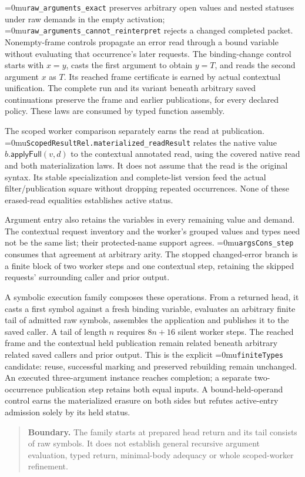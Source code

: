\documentclass[11pt,a4paper]{article}
\newcommand{\code}[1]{\texttt{\detokenize{#1}}}
\newcommand{\name}[1]{\textup{\Urlmuskip=0mu\relax\nolinkurl{#1}}}
\newcommand{\scope}[1]{\par\smallskip\begin{quote}\small\textbf{Boundary.} #1\end{quote}}
\begin{document}
\name{raw_arguments_exact} preserves arbitrary open values and nested
statuses under raw \code{Atom} demands in the empty activation;
\name{raw_arguments_cannot_reinterpret} rejects a changed completed packet.
Nonempty-frame controls propagate an error read through a bound variable
without evaluating that occurrence's later requests. The binding-change
control starts with $x=y$, casts the first argument to obtain $y=T$, and
reads the second argument $x$ as $T$. Its reached frame certificate is earned
by actual contextual unification. The complete run and its variant beneath
arbitrary saved continuations preserve the frame and earlier publications,
for every declared policy. These laws are consumed by typed function assembly.

The scoped worker comparison separately earns the read at publication.
\name{ScopedResultRel.materialized_readResult} relates the native value
$b.\mathsf{applyFull}(v,d)$ to the contextual annotated read, using the
covered native read and both materialization laws. It does not assume that
the read is the original syntax. Its stable specialization and complete-list
version feed the actual filter/publication square without dropping repeated
occurrences. None of these erased-read equalities establishes active status.

Argument entry also retains the variables in every remaining value and
demand. The contextual request inventory and the worker's grouped values and
types need not be the same list; their protected-name support agrees.
\name{argsCons_step} consumes that agreement at arbitrary arity. The stopped
changed-error branch is a finite block of two worker steps and one contextual
step, retaining the skipped requests' surrounding caller and prior output.

A symbolic execution family composes these operations. From a returned head,
it casts a first symbol against a fresh binding variable, evaluates an
arbitrary finite tail of admitted raw symbols, assembles the application and
publishes it to the saved caller. A tail of length $n$ requires $8n+16$ silent
worker steps. The reached frame and the contextual held publication remain
related beneath arbitrary related saved callers and prior output. This is
the explicit \name{finiteTypes} candidate: reuse, successful marking and
preserved rebuilding remain unchanged. An executed three-argument instance
reaches completion; a separate two-occurrence publication step retains both
equal inputs. A bound-held-operand control earns the materialized erasure on
both sides but refutes active-entry admission solely by its held status.
\scope{The family starts at prepared head return and its tail consists of raw
symbols. It does not establish general recursive argument evaluation, typed
return, minimal-body adequacy or whole scoped-worker refinement.}
\end{document}

